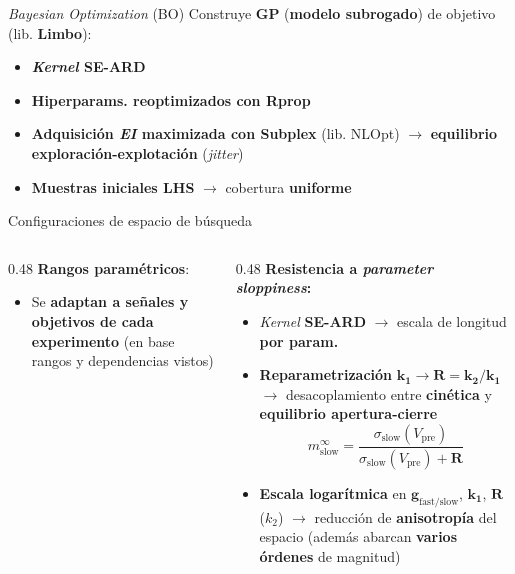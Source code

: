 \documentclass[10pt, aspectratio=169]{beamer}
\begin{document}
\begin{frame}{\textit{Bayesian Optimization} (BO)}
    Construye \textbf{GP} (\textbf{modelo subrogado}) de objetivo (lib. \textbf{Limbo}):
    \vspace{1em}
    \begin{itemize}
        \item \textbf{\textit{Kernel} SE-ARD}
        \item \textbf{Hiperparams. reoptimizados con Rprop}
        \item \textbf{Adquisición \textit{EI} maximizada con Subplex} (lib. NLOpt) $\to$ \textbf{equilibrio exploración-explotación} (\textit{jitter})
        \item \textbf{Muestras iniciales LHS} $\to$ cobertura \textbf{uniforme}
    \end{itemize}
\end{frame}


\begin{frame}{Configuraciones de espacio de búsqueda}
    \small
    \begin{columns}[t, onlytextwidth]
        \begin{column}{0.48\textwidth}
            \textbf{Rangos paramétricos}:
            \begin{itemize}
                \item[] Se \textbf{adaptan a señales y objetivos de cada experimento} (en base rangos y dependencias vistos)
            \end{itemize}
        \end{column}
        \begin{column}{0.48\textwidth}
            \textbf{Resistencia a \textit{parameter sloppiness}:}
            \begin{itemize}
                \item \textit{Kernel} \textbf{SE-ARD} $\to$ escala de longitud \textbf{por param.}
                \item \textbf{Reparametrización} $\boldsymbol{k_1 \to R = k_2/k_1}$ $\to$ desacoplamiento entre \textbf{cinética} y \textbf{equilibrio apertura-cierre}
                      \begin{equation*}
                          m_{\mathrm{slow}}^{\infty} = \frac{\sigma_{\mathrm{slow}}(V_{\mathrm{pre}})}{\sigma_{\mathrm{slow}}(V_{\mathrm{pre}}) + \boldsymbol{R}}
                      \end{equation*}
                      \vspace{-0.5em}
                \item \textbf{Escala logarítmica} en $\boldsymbol{g_{\mathrm{fast/slow}}}$, $\boldsymbol{k_1}$, $\boldsymbol{R}$ ($k_2$) $\to$ reducción de \textbf{anisotropía} del espacio (además abarcan \textbf{varios órdenes} de magnitud)
            \end{itemize}
        \end{column}
    \end{columns}
\end{frame}
\end{document}
